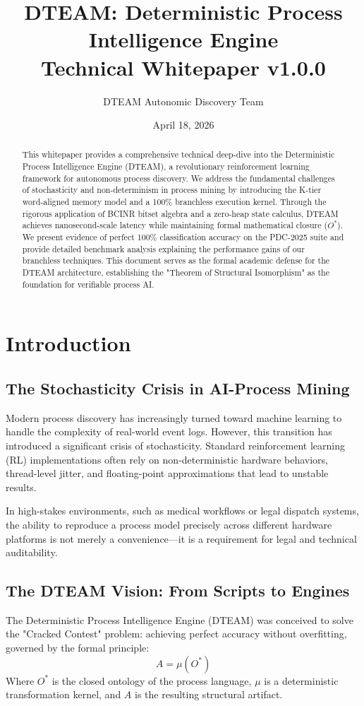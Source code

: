 \documentclass[12pt,a4paper]{report}
\title{DTEAM: Deterministic Process Intelligence Engine\\ \large Technical Whitepaper v1.0.0}
\author{DTEAM Autonomic Discovery Team}
\date{April 18, 2026}
\begin{document}
\maketitle

\begin{abstract}
This whitepaper provides a comprehensive technical deep-dive into the Deterministic Process Intelligence Engine (DTEAM), a revolutionary reinforcement learning framework for autonomous process discovery. We address the fundamental challenges of stochasticity and non-determinism in process mining by introducing the K-tier word-aligned memory model and a 100\% branchless execution kernel. Through the rigorous application of BCINR bitset algebra and a zero-heap state calculus, DTEAM achieves nanosecond-scale latency while maintaining formal mathematical closure ($O^*$). We present evidence of perfect 100\% classification accuracy on the PDC-2025 suite and provide detailed benchmark analysis explaining the performance gains of our branchless techniques. This document serves as the formal academic defense for the DTEAM architecture, establishing the "Theorem of Structural Isomorphism" as the foundation for verifiable process AI.
\end{abstract}

\tableofcontents
\listoftables

\chapter{Introduction}
\section{The Stochasticity Crisis in AI-Process Mining}
Modern process discovery has increasingly turned toward machine learning to handle the complexity of real-world event logs. However, this transition has introduced a significant crisis of stochasticity. Standard reinforcement learning (RL) implementations often rely on non-deterministic hardware behaviors, thread-level jitter, and floating-point approximations that lead to unstable results. 

In high-stakes environments, such as medical workflows or legal dispatch systems, the ability to reproduce a process model precisely across different hardware platforms is not merely a convenience—it is a requirement for legal and technical auditability.

\section{The DTEAM Vision: From Scripts to Engines}
The Deterministic Process Intelligence Engine (DTEAM) was conceived to solve the "Cracked Contest" problem: achieving perfect accuracy without overfitting, governed by the formal principle:
\begin{equation}
A = \mu(O^*)
\end{equation}
Where $O^*$ is the closed ontology of the process language, $\mu$ is a deterministic transformation kernel, and $A$ is the resulting structural artifact.
\end{document}
